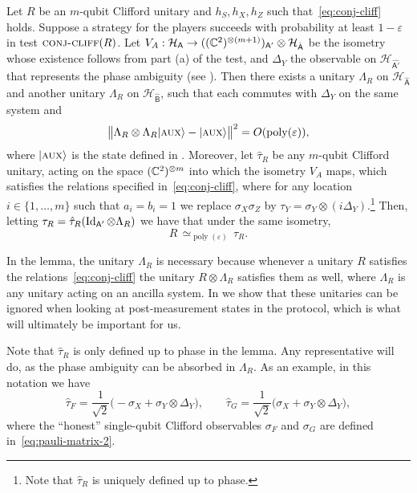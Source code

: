 \documentclass{toc}
\newcommand{\ket}[1]{|#1\rangle}
\newcommand{\Id}{\ensuremath{\mathop{\rm Id}\nolimits}}
\DeclareMathOperator{\poly}{poly}
\newcommand{\reg}[1]{{\textsf{#1}}}
\newcommand{\mH}{\mathcal{H}}
\newcommand{\eps}{\varepsilon}
\newcommand{\aux}{\textsc {aux}}
\newcommand{\conjc}{\textsc{conj-cliff}}
\newcommand{\phase}{\Lambda}
\begin{document}
\begin{lemma}\label{lem:cliff-conj}
Let $R$ be an $m$-qubit Clifford unitary and $h_S,h_X,h_Z$ such that~\eqref{eq:conj-cliff} holds. Suppose a strategy for the players succeeds with probability at least $1-\eps$ in test $\conjc(R)$. Let $V_A:\mH_\reg{A} \to ((\C^2)^{\otimes (m+1)})_{\reg{A}'}  \otimes {\mH}_{\hat{\reg{A}}}$ be the isometry whose existence follows from part (a) of the test, and $\Delta_Y$ the observable on $\mH_{\hat{\reg{A}'}}$ that represents the phase ambiguity (see ). 
Then there exists a unitary $\phase_R$ on ${\mH}_{\hat{\reg{A}}}$ and another unitary $\phase_R$ on ${\mH}_{\hat{\reg{B}}}$, such that each commutes with $\Delta_Y$ on the same system and
\begin{equation}\label{eq:r-stab}
 \big\|\phase_R \otimes \phase_R \ket{\aux} - \ket{\aux} \big\|^2 = O(\poly(\eps)),
\end{equation}
where $\ket{\aux}$ is the state defined in .
Moreover, let $\hat{\tau}_R$ be any $m$-qubit Clifford unitary, acting on the space $({\mathbb C}^2)^{\otimes m}$ into which the isometry $V_A$ maps, which satisfies the relations specified in~\eqref{eq:conj-cliff}, where for any location $i\in\{1,\ldots,m\}$ such that $a_i=b_i=1$ we replace $\sigma_X\sigma_Z$ by $\tau_Y = \sigma_Y \otimes (i\Delta_Y)$.\footnote{Note that $\hat{\tau}_R$ is uniquely defined up to phase.} Then, letting  $ \tau_R = \hat{\tau}_{R}(\Id_{\reg{A}'} \otimes \phase_R)$ we have that  under the same isometry,
$$R \,\simeq_{\poly(\eps)}\, \tau_R.$$
\end{lemma}

In the lemma, the unitary $\Lambda_R$ is necessary because whenever a unitary $R$ satisfies the relations~\eqref{eq:conj-cliff} the unitary $R\otimes \Lambda_R$ satisfies them as well, where $\Lambda_R$ is any unitary acting on an ancilla system. In  we show that these unitaries can be ignored when looking at post-measurement states in the protocol, which is what will ultimately be important for us.  

Note that $\hat{\tau}_R$ is only defined up to phase in the lemma. Any representative will do, as  the phase ambiguity can be absorbed in $\phase_R$. As an example, in this notation we have 
\begin{equation}\label{eq:hat-tau-def}
\hat{\tau}_F = \frac{1}{\sqrt{2}}\big(-\sigma_X + \sigma_Y \otimes \Delta_Y\big),\qquad \hat{\tau}_G = \frac{1}{\sqrt{2}}\big(\sigma_X + \sigma_Y \otimes \Delta_Y\big),
\end{equation}
where the ``honest'' single-qubit Clifford observables $\sigma_F$ and $\sigma_G$ are defined in~\eqref{eq:pauli-matrix-2}.
\end{document}
